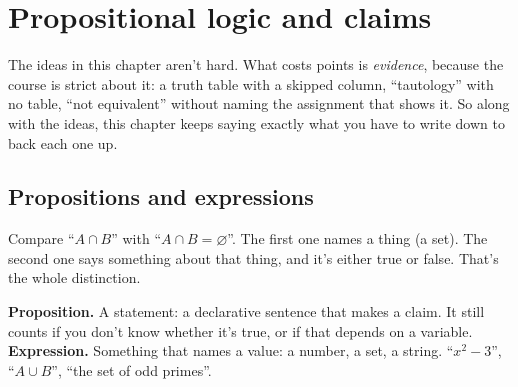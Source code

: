 \newcommand{\logCell}[3]{%
  \if T#3\fill[gray!35] (#1*0.62,-#2*0.62) rectangle ++(0.62,-0.62);\fi
  \node[font=\scriptsize] at (#1*0.62+0.31,-#2*0.62-0.31) {#3};}
\newcommand{\logGrid}[6]{%
  \begin{scope}[xshift=#1]
    \logCell{0}{0}{#3}\logCell{1}{0}{#4}\logCell{0}{1}{#5}\logCell{1}{1}{#6}
    \draw[step=0.62] (0,-1.24) grid (1.24,0);
    \node[font=\scriptsize] at (0.31,0.2) {$\mathrm{T}$};
    \node[font=\scriptsize] at (0.93,0.2) {$\mathrm{F}$};
    \node[font=\scriptsize] at (-0.22,-0.31) {$\mathrm{T}$};
    \node[font=\scriptsize] at (-0.22,-0.93) {$\mathrm{F}$};
    \node[font=\scriptsize] at (-0.3,0.25) {$P\backslash Q$};
    \node[font=\small] at (0.62,-1.62) {#2};
  \end{scope}}
\newcommand{\logT}{\mathrm{T}}
\newcommand{\logF}{\mathrm{F}}

\section{Propositional logic and claims}\label{logic:start}

The ideas in this chapter aren't hard. What costs points is \emph{evidence}, because the course is strict about it: a truth table with a skipped column, ``tautology'' with no table, ``not equivalent'' without naming the assignment that shows it. So along with the ideas, this chapter keeps saying exactly what you have to write down to back each one up.

\subsection{Propositions and expressions}

Compare ``$A\cap B$'' with ``$A\cap B=\varnothing$''. The first one names a thing (a set). The second one says something about that thing, and it's either true or false. That's the whole distinction.

\begin{notebox}
\textbf{Proposition.} A statement: a declarative sentence that makes a claim. It still counts if you don't know whether it's true, or if that depends on a variable.\\
\textbf{Expression.} Something that names a value: a number, a set, a string. ``$x^2-3$'', ``$A\cup B$'', ``the set of odd primes''.
\end{notebox}

